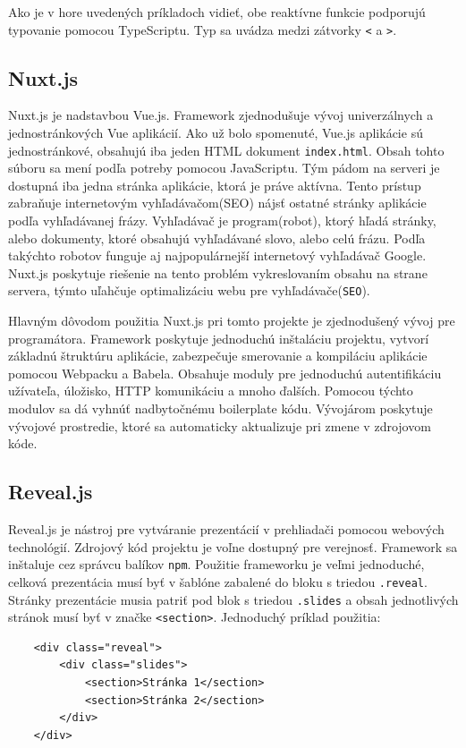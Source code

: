 Ako je v hore uvedených príkladoch vidieť, obe reaktívne funkcie podporujú typovanie pomocou TypeScriptu. Typ sa uvádza medzi zátvorky \texttt{<} a \texttt{>}.

\subsection{Nuxt.js}
\label{nuxt}
Nuxt.js je nadstavbou Vue.js. Framework zjednodušuje vývoj univerzálnych a jednostránkových Vue aplikácií. Ako už bolo spomenuté, Vue.js aplikácie sú jednostránkové, obsahujú iba jeden HTML dokument \texttt{index.html}. Obsah tohto súboru sa mení podľa potreby pomocou JavaScriptu. Tým pádom na serveri je dostupná iba jedna stránka aplikácie, ktorá je práve aktívna. Tento prístup zabraňuje internetovým vyhľadávačom(SEO) nájsť ostatné stránky aplikácie podľa vyhľadávanej frázy. Vyhľadávač je program(robot), ktorý hľadá stránky, alebo dokumenty, ktoré obsahujú vyhľadávané slovo, alebo celú frázu. Podľa takýchto robotov funguje aj najpopulárnejší internetový vyhľadávač Google. Nuxt.js poskytuje riešenie na tento problém vykreslovaním obsahu na strane servera, týmto uľahčuje optimalizáciu webu pre vyhľadávače(\texttt{SEO}).

Hlavným dôvodom použitia Nuxt.js pri tomto projekte je zjednodušený vývoj pre programátora. Framework poskytuje jednoduchú inštaláciu projektu, vytvorí základnú štruktúru aplikácie, zabezpečuje smerovanie a kompiláciu aplikácie pomocou Webpacku a Babela. Obsahuje moduly pre jednoduchú autentifikáciu užívateľa, úložisko, HTTP komunikáciu a mnoho ďalších. Pomocou týchto modulov sa dá vyhnúť nadbytočnému boilerplate kódu. Vývojárom poskytuje vývojové prostredie, ktoré sa automaticky aktualizuje pri zmene v zdrojovom kóde.

\subsection{Reveal.js}
\label{reveal}
Reveal.js je nástroj pre vytváranie prezentácií v prehliadači pomocou webových technológií. Zdrojový kód projektu je voľne dostupný pre verejnosť. Framework sa inštaluje cez správcu balíkov \texttt{npm}. Použitie frameworku je veľmi jednoduché, celková prezentácia musí byť v šablóne zabalené do bloku s triedou \texttt{.reveal}. Stránky prezentácie musia patriť pod blok s triedou \texttt{.slides} a obsah jednotlivých stránok musí byť v značke \texttt{<section>}. Jednoduchý príklad použitia:

    \begin{verbatim}
    <div class="reveal">
        <div class="slides">
            <section>Stránka 1</section>
            <section>Stránka 2</section>
        </div>
    </div>
    \end{verbatim}


